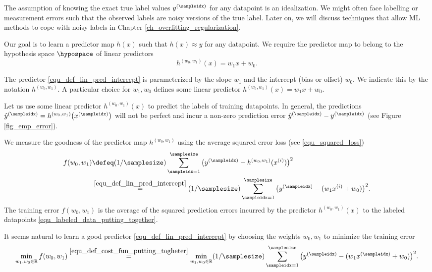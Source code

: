 \documentclass[12pt]{report}
\begin{document}
The assumption of knowing the exact true label values $y^{(\sampleidx)}$ 
for any datapoint is an idealization. We might often face labelling 
or measurement errors such that the observed labels are noisy 
versions of the true label. Later on, we will discuss techniques that allow ML 
methods to cope with noisy labels in Chapter \ref{ch_overfitting_regularization}. 

Our goal is to learn a predictor map $h(x)$ such that $h(x) \approx y$ 
for any datapoint. We require the predictor map to belong to 
the hypothesis space $\hypospace$ of linear predictors 
\begin{equation} 
\label{equ_def_lin_pred_intercept}
h^{(w_{0},w_{1})}(x) = w_{1} x + w_{0}. 
\end{equation}

The predictor \eqref{equ_def_lin_pred_intercept} is parameterized by the slope 
$w_{1}$ and the intercept (bias or offset) $w_{0}$. We indicate this by the 
notation $h^{(w_{0},w_{1})}$. A particular choice for $w_{1},w_{0}$ 
defines some linear predictor $h^{(w_{0},w_{1})}(x) = w_{1}x +w_{0}$. 

Let us use some linear predictor $h^{(w_{0},w_{1})}(x)$ to predict the labels of 
training datapoints. In general, the predictions $\hat{y}^{(\sampleidx)} = h^{(w_{0},w_{1})}\big(x^{(\sampleidx)}\big)$ 
will not be perfect and incur a non-zero prediction error $\hat{y}^{(\sampleidx)} - y^{(\sampleidx)}$ (see Figure \ref{fig_emp_error}).  

We measure the goodness of the predictor map $h^{(w_{0},w_{1})}$ 
using the average squared error loss (see \eqref{equ_squared_loss})
\begin{align}
\label{equ_def_cost_fun_putting_togheter}
f(w_{0},w_{1}) & \defeq (1/\samplesize) \sum_{\sampleidx=1}^{\samplesize} \big( y^{(\sampleidx)} - h^{(w_{0},w_{1})}(x^{(i)})  \big)^{2} \nonumber \\
& \stackrel{\eqref{equ_def_lin_pred_intercept}}{=}  (1/\samplesize) \sum_{\sampleidx=1}^{\samplesize} \big( y^{(\sampleidx)} - ( w_{1} x^{(i)} + w_{0}) \big)^{2}. 
\end{align}
The training error $f(w_{0},w_{1})$ is the average of the squared 
prediction errors incurred by the predictor $h^{(w_{0},w_{1})}(x)$ 
to the labeled datapoints \eqref{equ_labeled_data_putting_together}. 

It seems natural to learn a good predictor \eqref{equ_def_lin_pred_intercept} 
by choosing the weights $w_{0},w_{1}$ to minimize the training error 
\begin{equation}
\min_{w_{1},w_{0} \in \mathbb{R}} f(w_{0},w_{1}) \stackrel{\eqref{equ_def_cost_fun_putting_togheter}}{=} \min_{w_{1},w_{0} \in \mathbb{R}}   (1/\samplesize) \sum_{\sampleidx=1}^{\samplesize} \big( y^{(\sampleidx)} - ( w_{1} x^{(\sampleidx)} + w_{0}) \big)^{2}.
\end{equation} 
\end{document}
